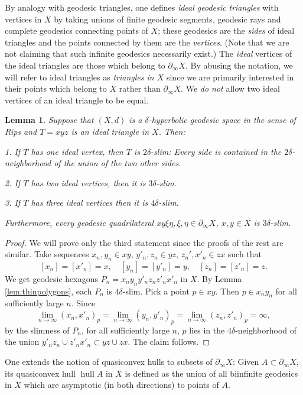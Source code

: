 \documentclass[12pt]{amsbook}%
\newtheorem{lem}[thm]{Lemma}
\theoremstyle{definition}
\theoremstyle{remark}
\numberwithin{section}{chapter}
\numberwithin{subsection}{section}
\numberwithin{figure}{chapter}
\DeclareMathOperator{\hull}{hull}
\def\geo{\partial_\infty}
\def\ol{\overline}
\begin{document}
 By analogy with geodesic triangles, one defines {\em ideal geodesic triangles} with vertices in $\ol{X}$ by taking unions 
 of finite geodesic segments, geodesic rays and complete geodesics connecting points of  $\ol{X}$; these geodesics 
 are the {\em sides} of ideal triangles and the points connected by them are the {\em vertices}. (Note that we are not claiming that such infinite geodesics necessarily exist.)  The {\em ideal} vertices of the ideal triangles are those which belong to $\geo X$. By abusing the notation, we will refer to ideal triangles as {\em triangles in $X$} since we are primarily interested in their points which belong to $X$ rather than $\geo X$. We {\em do not} allow two ideal vertices of an ideal triangle to be equal. 
 
\begin{lem}\label{lem:idealthinness}
Suppose that $(X,d)$ is a $\delta$-hyperbolic geodesic space in the sense of Rips and $T=xyz$ is an ideal triangle in $X$. Then:

1. If $T$ has one ideal vertex, then $T$ is $2\delta$-slim: Every side is contained in the $2\delta$-neighborhood of the union of the two other sides. 

2. If $T$ has two ideal vertices, then it is $3\delta$-slim.

3. If $T$ has three ideal vertices then it is $4\delta$-slim.

Furthermore, every geodesic quadrilateral $xy\xi \eta, \xi, \eta\in \geo X$, $x, y\in X$ is $3\delta$-slim.  
\end{lem} 
\begin{proof} We will prove only the third statement since the proofs of the rest are similar. Take sequences 
$x_n, y_n\in xy$, $y'_n, z_n\in yz$, $z_n', x'_n\in zx$ such that
$$
[x_n]=[x'_n]=x, \quad [y_n]=[y'_n]=y, \quad [z_n]=[z'_n]=z. 
$$
We get geodesic hexagons $P_n=x_ny_ny'_nz_nz'_nx'_n$ in $X$. By Lemma \ref{lem:thinpolygons}, each $P_n$ is $4\delta$-slim. Pick a point $p\in xy$. Then $p\in x_ny_n$ for all sufficiently large $n$. Since
$$
\lim_{n\to\infty} (x_n,x'_n)_p= \lim_{n\to\infty} (y_n,y'_n)_p= \lim_{n\to\infty} (z_n,z'_n)_p=\infty,
$$
by the slimness of $P_n$, for all sufficiently large $n$, $p$ lies in the $4\delta$-neighborhood of the union $y'_nz_n \cup z'_n x'_n\subset yz\cup zx$. The claim follows. 
\end{proof}

One extends the notion of quasiconvex hulls to subsets of $\geo X$: Given $A\subset \geo X$, its quasiconvex hull $\hull A$ in $X$ is defined as the union of all biinfinite geodesics in $X$ which are asymptotic (in both directions) to points of $A$. 
\end{document}
